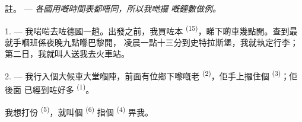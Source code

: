 %
%
%
%
%
%
%
%
%

\VUsaut{4.0mm}
\VUsaut{2.4mm}
\VUsaut{3.4mm}
\textsc{註。} --- \textit{各國用嘅時間表都唔同，所以我哋攞}
\textit{嘅鐘數做例。}

1. --- 我啱啱去咗德國一趟。出發之前，我買咗本
\textsuperscript{(15)}，睇下啲車幾點開。查到最就手嗰班係夜晚九點喺巴黎開，
凌晨一點十三分到史特拉斯堡，我就執定行李；第二日，我就叫人送我去火車站。

2. --- 我行入個大候車大堂嗰陣，前面有位鄉下嚟嘅老
\textsuperscript{(2)}，佢手上攞住個 \textsuperscript{(3)}；佢後面
已經到咗好多 \textsuperscript{(1)}。

我想打份 \textsuperscript{(5)}，就叫個 \textsuperscript{(6)}
指個 \textsuperscript{(4)} 畀我。

